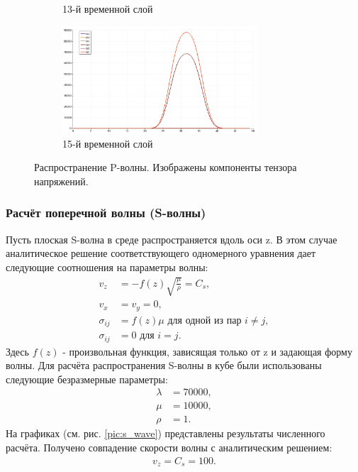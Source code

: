 \begin{figure}[htp]
\begin{subfigure}[b]{0.5\textwidth}
\caption{13-й временной слой}
\end{subfigure}
\begin{subfigure}[b]{0.5\textwidth}
\centering
\includegraphics[width=0.8\textwidth]{png/p-wave-test/s/0015.png}
\caption{15-й временной слой}
\end{subfigure}
\caption{Распространение P-волны. Изображены компоненты тензора напряжений.}
\label{pic:p_wave}
\end{figure}

\clearpage
\newpage

\subsubsection{Расчёт поперечной волны (S-волны)}
Пусть плоская S-волна в среде распространяется вдоль оси z. В этом случае аналитическое решение соответствующего одномерного уравнения дает следующие соотношения на параметры волны:
\begin{align}
v_z&=-f(z)\sqrt{\frac{\mu}{\rho}}=C_s, \nonumber\\
v_x&=v_y=0, \nonumber\\
\sigma_{ij}&=f(z)\mu \textrm{ для одной из пар } i \neq j, \nonumber\\
\sigma_{ij}&=0 \textrm{ для } i = j.
\end{align}
Здесь $f(z)$ - произвольная функция, зависящая только от z и задающая форму волны.
Для расчёта распространения S-волны в кубе были использованы следующие безразмерные параметры: 
\begin{align}
\lambda&=70000, \nonumber\\
\mu&=10000, \nonumber\\
\rho&=1.
\end{align}
На графиках (см. рис. \ref{pic:s_wave}) представлены результаты численного расчёта. Получено совпадение скорости волны с аналитическим решением:
\begin{align}
v_z=C_s=100.
\end{align}


